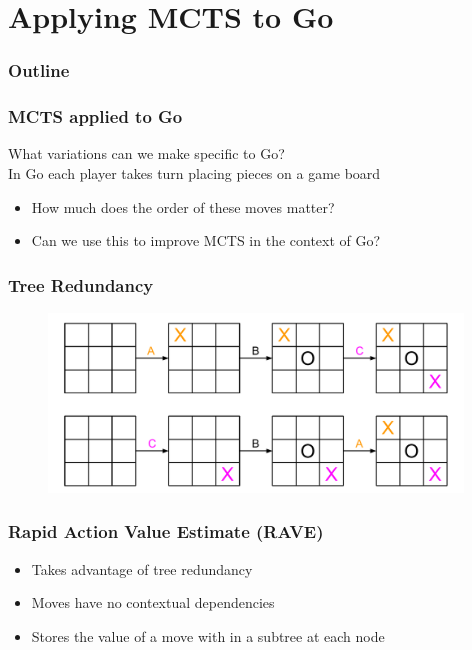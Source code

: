 \documentclass{beamer}
\begin{document}
\section{Applying MCTS to Go}

\begin{frame}
\frametitle{Outline}
\tableofcontents[currentsection]
\end{frame}

\begin{frame}
\frametitle{MCTS applied to Go}
What variations can we make specific to Go? \\
In Go each player takes turn placing pieces on a game board
\begin{itemize}
	\item How much does the order of these moves matter?
	\item Can we use this to improve MCTS in the context of Go?
\end{itemize}
\end{frame}

\begin{frame}[fragile]
\frametitle{Tree Redundancy}
\begin{figure}[h]
	\includegraphics[width=11cm]{Diagrams/TicTacToe/MoveOrderNotMattering.pdf}
	\centering
\end{figure}
\end{frame}

\begin{frame}
\frametitle{Rapid Action Value Estimate (RAVE)}
\begin{itemize}
	\item Takes advantage of tree redundancy
	\item Moves have no contextual dependencies
	\item Stores the value of a move with in a subtree at each node
\end{itemize}
\end{frame}
\end{document}
